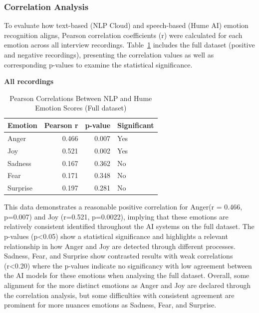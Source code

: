 \subsubsection{Correlation Analysis}

To evaluate how text-based (NLP Cloud) and speech-based (Hume AI) emotion recognition aligns, Pearson correlation coefficients (r) were calculated for each emotion across all interview recordings. 
Table~\ref{tab:corr_all} includes the full dataset (positive and negative recordings), presenting the correlation values as well as corresponding p-values to examine the statistical significance. 

\begin{table}[H]
    \centering
    \caption*{\textbf{All recordings}}
    \begin{tabular}{lrrl}
      \toprule
      \textbf{Emotion} & \textbf{Pearson r} & \textbf{p-value} & \textbf{Significant}\\
      \midrule
      Anger    & 0.466 & 0.007 & Yes \\
      Joy      & 0.521 & 0.002 & Yes \\
      Sadness  & 0.167 & 0.362 & No  \\
      Fear     & 0.171 & 0.348 & No  \\
      Surprise & 0.197 & 0.281 & No  \\
      \bottomrule
    \end{tabular}
    \caption{Pearson Correlations Between NLP and Hume Emotion Scores (Full dataset)}
    \label{tab:corr_all}
  \end{table}

This data demonstrates a reasonable positive correlation for Anger(r = 0.466, p=0.007) and Joy (r=0.521, p=0.0022), implying that these emotions are relatively consistent identified throughout the AI systems on the full dataset. 
The p-values (p<0.05) show a statistical significance and highlights a relevant relationship in how Anger and Joy are detected through different processes. 
Sadness, Fear, and Surprise show contrasted results with weak correlations (r<0.20) where the p-values indicate no significancy with low agreement between the AI models for these emotions when analysing the full dataset. 
Overall, some alignment for the more distinct emotions as Anger and Joy are declared through the correlation analysis, but some difficulties with consistent agreement are prominent for more nuances emotions as Sadness, Fear, and Surprise. 

